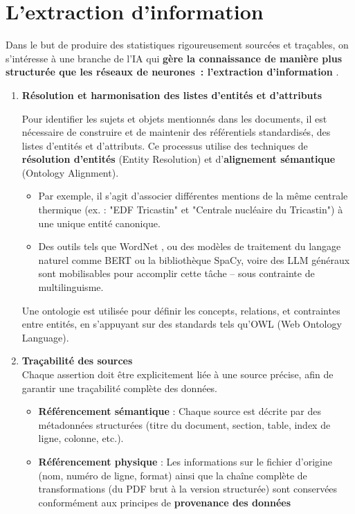 \documentclass[a4paper,11pt]{report}
\providecommand{\tightlist}{\setlength{\itemsep}{0pt}\setlength{\parskip}{0pt}}
\begin{document}
\section{L'extraction d'information}\label{lextraction-dinformation}

Dans le but de produire des statistiques rigoureusement sourcées et traçables, on s'intéresse à une branche de l'IA qui \textbf{\textbf{gère la connaissance de manière plus }\textbf{structurée }\textbf{que les réseaux de neurone}\textbf{s~: l'extraction d'information }}\citep{MZNGHBPG,D2S7WQT2,P7LFRX4U}.
\begin{enumerate}
\item
  \textbf{\textbf{R}ésolution et harmonisation \textbf{des l}istes d'entités et d'attributs}

  Pour identifier les sujets et objets mentionnés dans les documents, il est nécessaire de construire et de maintenir des référentiels standardisés, des listes d'entités et d'attributs. Ce processus utilise des techniques de \textbf{résolution d'entités} (Entity Resolution) et d'\textbf{alignement sémantique} (Ontology Alignment).

  \begin{itemize}
  \tightlist
  \item
    Par exemple, il s'agit d'associer différentes mentions de la même centrale thermique (ex. : "EDF Tricastin" et "Centrale nucléaire du Tricastin") à une unique entité canonique.
  \item
    Des outils tels que WordNet \citep{HCJ9T9WB}, ou des modèles de traitement du langage naturel comme BERT \citep{8D7DVVLH} ou la bibliothèque SpaCy, voire des LLM généraux sont mobilisables pour accomplir cette tâche -- sous contrainte de multilinguisme.
  \end{itemize}

  Une ontologie \citep{LZZR746L} est utilisée pour définir les concepts, relations, et contraintes entre entités, en s'appuyant sur des standards tels qu'OWL (Web Ontology Language).
\item
  \textbf{Traçabilité des sources}\\
  Chaque assertion doit être explicitement liée à une source précise, afin de garantir une traçabilité complète des données.

  \begin{itemize}
  \tightlist
  \item
    \textbf{Référencement sémantique} : Chaque source est décrite par des métadonnées structurées (titre du document, section, table, index de ligne, colonne, etc.).
  \item
    \textbf{Référencement physique} : Les informations sur le fichier d'origine (nom, numéro de ligne, format) ainsi que la chaîne complète de transformations (du PDF brut à la version structurée) sont conservées conformément aux principes de \textbf{provenance des données} \citep{LXQUK658}
  \end{itemize}


\end{enumerate}
\end{document}
